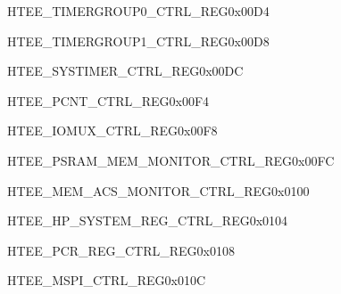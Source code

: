 \begin{register}{H}{TEE\_TIMERGROUP0\_CTRL\_REG}{0x00D4}\label{regdesc:TEETIMERGROUP0CTRLREG}
\end{register}\vspace{-3em}

\begin{register}{H}{TEE\_TIMERGROUP1\_CTRL\_REG}{0x00D8}\label{regdesc:TEETIMERGROUP1CTRLREG}
\end{register}\vspace{-3em}

\begin{register}{H}{TEE\_SYSTIMER\_CTRL\_REG}{0x00DC}\label{regdesc:TEESYSTIMERCTRLREG}
\end{register}\vspace{-3em}

\begin{register}{H}{TEE\_PCNT\_CTRL\_REG}{0x00F4}\label{regdesc:TEEPCNTCTRLREG}
\end{register}\vspace{-3em}

\begin{register}{H}{TEE\_IOMUX\_CTRL\_REG}{0x00F8}\label{regdesc:TEEIOMUXCTRLREG}
\end{register}\vspace{-3em}

\begin{register}{H}{TEE\_PSRAM\_MEM\_MONITOR\_CTRL\_REG}{0x00FC}\label{regdesc:TEEPSRAMMEMMONITORCTRLREG}
\end{register}\vspace{-3em}

\begin{register}{H}{TEE\_MEM\_ACS\_MONITOR\_CTRL\_REG}{0x0100}\label{regdesc:TEEMEMACSMONITORCTRLREG}
\end{register}\vspace{-3em}

\begin{register}{H}{TEE\_HP\_SYSTEM\_REG\_CTRL\_REG}{0x0104}\label{regdesc:TEEHPSYSTEMREGCTRLREG}
\end{register}\vspace{-3em}

\begin{register}{H}{TEE\_PCR\_REG\_CTRL\_REG}{0x0108}\label{regdesc:TEEPCRREGCTRLREG}
\end{register}\vspace{-3em}

\begin{register}{H}{TEE\_MSPI\_CTRL\_REG}{0x010C}\label{regdesc:TEEMSPICTRLREG}
\end{register}\vspace{-3em}

